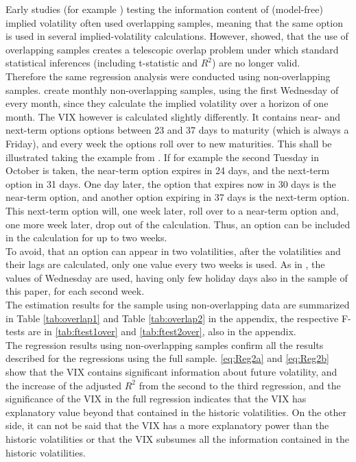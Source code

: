 Early studies (for example \textcite{canina1993}) testing the information content of (model-free) implied volatility often used overlapping samples, meaning that the same option is used in several implied-volatility calculations. However, \textcite{christensen2001} showed, that the use of overlapping samples creates a telescopic overlap problem under which standard statistical inferences (including t-statistic and $R^{2}$) are no longer valid.\\
Therefore the same regression analysis were conducted using non-overlapping samples. \textcite{jiang2003} create monthly non-overlapping samples, using the first Wednesday of every month, since they calculate the implied volatility over a horizon of one month. The VIX however is calculated slightly differently. It contains near- and next-term options options between 23 and 37 days to maturity (which is always a Friday), and every week the options roll over to new maturities. This shall be illustrated taking the example from \textcite{exchange2009}. If for example the second Tuesday in October is taken, the near-term option expires in 24 days, and the next-term option in 31 days. One day later, the option that expires now in 30 days is the near-term option, and another option expiring in 37 days is the next-term option. This next-term option will, one week later, roll over to a near-term option and, one more week later, drop out of the calculation. Thus, an option can be included in the calculation for up to two weeks. \\
To avoid, that an option can appear in two volatilities, after the volatilities and their lags are calculated, only one value every two weeks is used. As in \textcite{jiang2003}, the values of Wednesday are used, having only few holiday days also in the sample of this paper, for each second week.\\
The estimation results for the sample using non-overlapping data are summarized in Table \ref{tab:overlap1} and Table \ref{tab:overlap2} in the appendix, the respective F-tests are in \ref{tab:ftest1over} and \ref{tab:ftest2over}, also in the appendix.\\
The regression results using non-overlapping samples confirm all the results described for the regressions using the full sample. \ref{eq:Reg2a} and \ref{eq:Reg2b} show that the VIX contains significant information about future volatility, and the increase of the adjusted $R^{2}$ from the second to the third regression, and the significance of the VIX in the full regression indicates that the VIX has explanatory value beyond that contained in the historic volatilities. On the other side, it can not be said that the VIX has a more explanatory power than the historic volatilities or that the VIX subsumes all the information contained in the historic volatilities.\\
